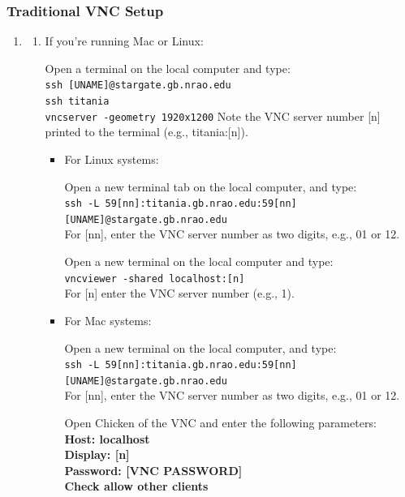 \documentclass[11pt, reqno, tbtags]{article}
\begin{document}
\subsubsection{Traditional VNC Setup}\label{sssec:old} %
\begin{enumerate}
 \item \begin{enumerate}
  \item \label{st:vnc} If you're running Mac or Linux: %
  
  Open a terminal on the local computer and type: \\
  \indent\texttt{ssh [UNAME]@stargate.gb.nrao.edu \\
  \indent ssh titania \\                                                                   
  \indent vncserver -geometry 1920x1200}
  Note the VNC server number [n] printed to the terminal (e.g., titania:[n]).         
  \begin{itemize}
   \item\label{st:open} %
   For Linux systems: 
   
   Open a new terminal tab on the local computer, and type: \\
   \indent\texttt{ssh -L 59[nn]:titania.gb.nrao.edu:59[nn] [UNAME]@stargate.gb.nrao.edu} \\       
   For [nn], enter the VNC server number as two digits, e.g., 01 or 12.
   
   Open a new terminal on the local computer and type: \\
   \texttt{vncviewer -shared localhost:[n]} \\
   For [n] enter the VNC server number (e.g., 1). 

   \item For Mac systems: %
   
   Open a new terminal on the local computer, and type: \\
   \texttt{ssh -L 59[nn]:titania.gb.nrao.edu:59[nn] [UNAME]@stargate.gb.nrao.edu} \\        
   For [nn], enter the VNC server number as two digits, e.g., 01 or 12.
   
   Open Chicken of the VNC and enter the following parameters: \\
   \textbf{Host: localhost \\
   Display: [n] \\
   Password: [VNC PASSWORD] \\
   Check allow other clients }


\end{itemize}
\end{enumerate}
\end{enumerate}
\end{document}
